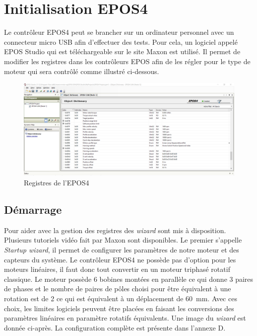 \section{Initialisation EPOS4}\label{sec:InitEPOS4}
Le contrôleur EPOS4 peut se brancher sur un ordinateur personnel avec un connecteur micro USB afin d'effectuer des tests. Pour cela, un logiciel
appelé EPOS Studio qui est téléchargeable sur le site Maxon\cite{Maxon} est utilisé. Il permet de modifier les registres dans les contrôleurs EPOS
afin de les régler pour le type de moteur qui sera contrôlé comme illustré ci-dessous.

\begin{figure}[H]
    \centering
    \includegraphics[width = \textwidth]{assets/figures/Registres.png}
    \caption{Registres de l'EPOS4}
    \label{fig:Registres}
\end{figure}

\subsection{Démarrage}\label{subsec:Demarrage}
Pour aider avec la gestion des registres des \textit{\gls{wizard}} sont mis à disposition. Plusieurs tutoriels vidéo fait par Maxon \cite{TutoMaxon}
sont disponibles. Le premier s'appelle \textit{Startup wizard}, il permet de configurer les paramètres de notre moteur et des capteurs du système.
Le contrôleur EPOS4 ne possède pas d'option pour les moteurs linéaires, il faut donc tout convertir en un moteur triphasé rotatif classique.
Le moteur possède 6 bobines montées en parallèle ce qui donne 3 paires de phases et le nombre de paires de pôles choisi pour être équivalent à
une rotation est de 2 ce qui est équivalent à un déplacement de 60~mm. Avec ces choix, les limites logiciels peuvent être placées en faisant les
conversions des paramètres linéaires en paramètre rotatifs équivalents. Une image du \textit{\gls{wizard}} est donnée ci-après. La configuration
complète est présente dans l'annexe D.

